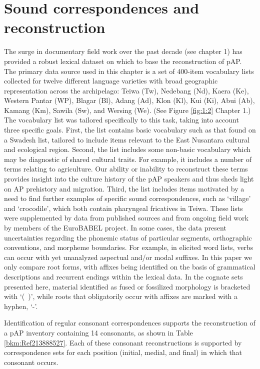 \section{Sound correspondences and reconstruction}\label{sec:2:2}
\label{bkm:Ref214155962}The surge in documentary field work over the past decade (see chapter 1) has provided a robust lexical dataset on which to base the reconstruction of pAP. The primary data source used in this chapter is a set of 400-item vocabulary lists collected for twelve different language varieties with broad geographic representation across the archipelago: Teiwa (Tw), Nedebang (Nd), Kaera (Ke), Western Pantar (WP), Blagar (Bl), Adang (Ad), Klon (Kl), Kui (Ki), Abui (Ab), Kamang (Km), Sawila (Sw), and Wersing (We). (See Figure \ref{fig:1:2} Chapter 1.) The vocabulary list was tailored specifically to this task, taking into account three specific goals. First, the list contains basic vocabulary such as that found on a Swadesh list, tailored to include items relevant to the East Nusantara cultural and ecological region. Second, the list includes some non-basic vocabulary which may be diagnostic of shared cultural traits. For example, it includes a number of terms relating to agriculture. Our ability or 
inability to reconstruct these terms provides insight into the culture history of the pAP speakers and thus sheds light on AP prehistory and migration. Third, the list includes items motivated by a need to find further examples of specific sound correspondences, such as `village' and `crocodile', which both contain pharyngeal fricatives in Teiwa. These lists were supplemented by data from published sources and from ongoing field work by members of the EuroBABEL project. In some cases, the data present uncertainties regarding the phonemic status of particular segments, orthographic conventions, and morpheme boundaries. For example, in elicited word lists, verbs can occur with yet unanalyzed aspectual and/or modal suffixes. In this paper we only compare root forms, with affixes being identified on the basis of grammatical descriptions and recurrent endings within the lexical data. In the cognate sets presented here, material identified as fused or fossilized morphology is bracketed with `(~)', while roots that 
obligatorily occur with affixes are marked with a hyphen, `-'. 

Identification of regular consonant correspondences supports the reconstruction of a pAP inventory containing 14 consonants, as shown in Table \ref{bkm:Ref213888527}. Each of these consonant reconstructions is supported by correspondence sets for each position (initial, medial, and final) in which that consonant occurs. 



